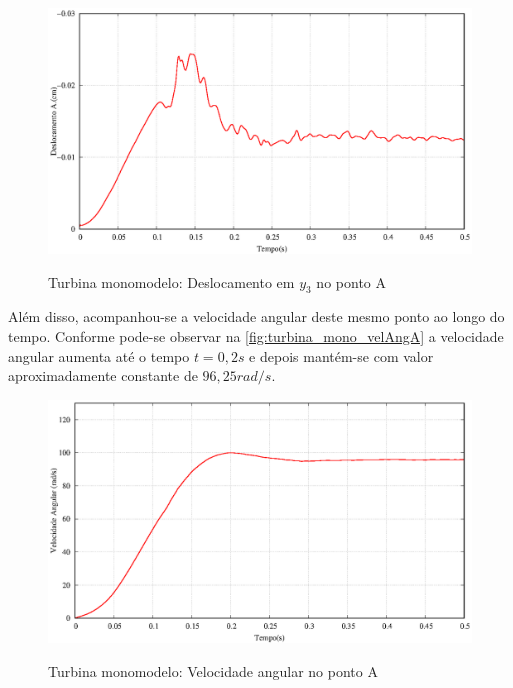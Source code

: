 \begin{figure}[!htbp]
	\caption{Turbina monomodelo: Deslocamento em $y_3$ no ponto A}
	\centering 
	\includegraphics[scale=0.6,trim=0cm 0cm 0cm 0cm, clip=true]{Imagens/Cap7/turbina_mono_deslocamento.eps}	
	\label{fig:turbina_mono_deslA}
\end{figure}

Além disso, acompanhou-se a velocidade angular deste mesmo ponto ao longo do tempo. Conforme pode-se observar na \autoref{fig:turbina_mono_velAngA} a velocidade angular aumenta até o tempo $t=0,2s$ e depois mantém-se com valor aproximadamente constante de $96,25rad/s$.

\begin{figure}[!htbp]
	\caption{Turbina monomodelo: Velocidade angular no ponto A}
	\centering 
	\includegraphics[scale=0.6,trim=0cm 0cm 0cm 0cm, clip=true]{Imagens/Cap7/turbina_mono_velocidade_angular.eps}	
	\label{fig:turbina_mono_velAngA}
\end{figure}

